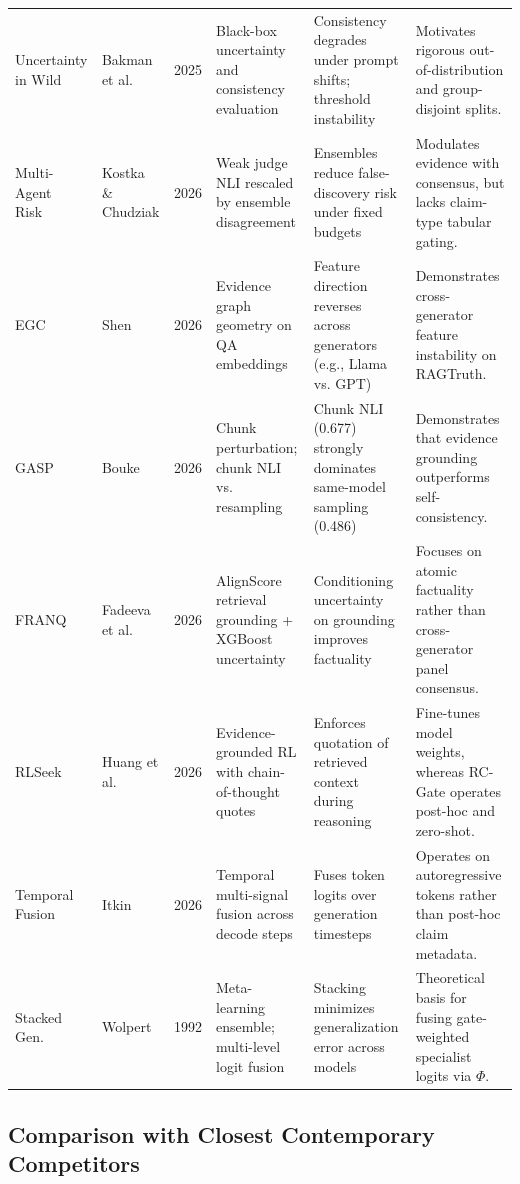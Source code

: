 \documentclass[pdflatex,sn-mathphys,Numbered]{sn-jnl}
\begin{document}
\begin{table}[htbp]
\begin{tabular}{@{}p{2.3cm}p{1.6cm}cp{2.2cm}p{2.7cm}p{2.8cm}@{}}
\addlinespace
Uncertainty in Wild~\cite{bakman2025wild} & Bakman et al. & 2025 & Black-box uncertainty and consistency evaluation & Consistency degrades under prompt shifts; threshold instability & Motivates rigorous out-of-distribution and group-disjoint splits. \\
\addlinespace
Multi-Agent Risk~\cite{kostka2026uncertainty} & Kostka \& Chudziak & 2026 & Weak judge NLI rescaled by ensemble disagreement & Ensembles reduce false-discovery risk under fixed budgets & Modulates evidence with consensus, but lacks claim-type tabular gating. \\
\addlinespace
EGC~\cite{shen2026egc} & Shen & 2026 & Evidence graph geometry on QA embeddings & Feature direction reverses across generators (e.g., Llama vs. GPT) & Demonstrates cross-generator feature instability on RAGTruth. \\
\addlinespace
GASP~\cite{bouke2026gasp} & Bouke & 2026 & Chunk perturbation; chunk NLI vs. resampling & Chunk NLI (0.677) strongly dominates same-model sampling (0.486) & Demonstrates that evidence grounding outperforms self-consistency. \\
\addlinespace
FRANQ~\cite{fadeeva2026franq} & Fadeeva et al. & 2026 & AlignScore retrieval grounding + XGBoost uncertainty & Conditioning uncertainty on grounding improves factuality & Focuses on atomic factuality rather than cross-generator panel consensus. \\
\addlinespace
RLSeek~\cite{huang2026rlseek} & Huang et al. & 2026 & Evidence-grounded RL with chain-of-thought quotes & Enforces quotation of retrieved context during reasoning & Fine-tunes model weights, whereas RC-Gate operates post-hoc and zero-shot. \\
\addlinespace
Temporal Fusion~\cite{itkin2026temporal} & Itkin & 2026 & Temporal multi-signal fusion across decode steps & Fuses token logits over generation timesteps & Operates on autoregressive tokens rather than post-hoc claim metadata. \\
\addlinespace
Stacked Gen.~\cite{wolpert1992stacked} & Wolpert & 1992 & Meta-learning ensemble; multi-level logit fusion & Stacking minimizes generalization error across models & Theoretical basis for fusing gate-weighted specialist logits via $\Phi$. \\
\bottomrule
\end{tabular}
\end{table}

\subsection{Comparison with Closest Contemporary Competitors}\label{subsec:competitor_comparison}
\end{document}
